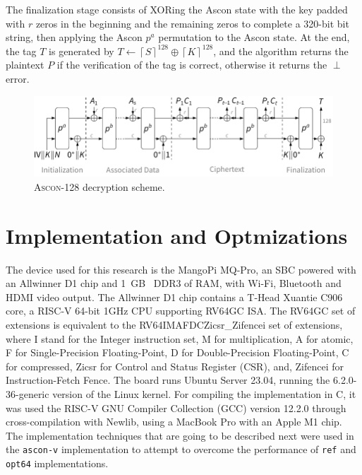 \documentclass[11pt,twoside]{article}
\begin{document}
The finalization stage consists of XORing the Ascon state with the key padded with $r$ zeros in the beginning and the remaining zeros to complete a 320-bit bit string, then applying the Ascon $p^a$ permutation to the Ascon state. At the end, the tag $T$ is generated by $T \leftarrow {\left \lceil  S \right \rceil}^{128} \oplus  {\left \lceil  K \right \rceil}^{128}$, and the algorithm returns the plaintext $P$ if the verification of the tag is correct, otherwise it returns the $\perp$ error.

\begin{figure}[h]
  \centering
  \includegraphics[scale=0.8]{assets/aead_decrypt.pdf}
  \caption{\textsc{Ascon-128} decryption scheme.}
  \label{fig:ascon128decrypt}
\end{figure}


\section{Implementation and Optmizations}

The device used for this research is the MangoPi MQ-Pro, an SBC powered with an Allwinner D1 chip and 1 GB  DDR3 of RAM, with Wi-Fi, Bluetooth and HDMI video output. The Allwinner D1 chip contains a T-Head Xuantie C906 core, a RISC-V 64-bit 1GHz CPU supporting \textsf{RV64GC} ISA. The \textsf{RV64GC} set of extensions is equivalent to the \textsf{RV64IMAFDCZicsr\_Zifencei} set of extensions, where \textsf{I} stand for the Integer instruction set, \textsf{M} for multiplication, \textsf{A} for atomic, \textsf{F} for Single-Precision Floating-Point, \textsf{D} for Double-Precision Floating-Point, \textsf{C} for compressed, \textsf{Zicsr} for Control and Status Register (CSR), and, \textsf{Zifencei} for Instruction-Fetch Fence. The board runs Ubuntu Server 23.04, running the 6.2.0-36-generic version of the Linux kernel. For compiling the implementation in C, it was used the RISC-V GNU Compiler Collection (GCC) version 12.2.0 \cite{riscvgnutoolchainv2023} through cross-compilation with Newlib, using a MacBook Pro with an Apple M1 chip. The implementation techniques that are going to be described next were used in the \texttt{ascon-v} implementation to attempt to overcome the performance of \texttt{ref} and \texttt{opt64} implementations.
\end{document}
